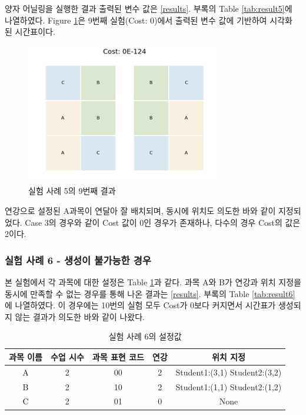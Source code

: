 \documentclass[12pt,a4paper]{article}
\begin{document}
    양자 어닐링을 실행한 결과 출력된 변수 값은 \ref{results}. 부록의 Table \ref{tab:result5}에 나열하였다. Figure \ref{fig:case5}은 9번째 실험(Cost: 0)에서 출력된 변수 값에 기반하여 시각화 된 시간표이다.

    \begin{figure}[htb!]
        \centering
        \includegraphics[width=\textwidth]{Case5.png}
        \caption{실험 사례 5의 9번째 결과}
        \label{fig:case5}
    \end{figure}

    연강으로 설정된 A과목이 연달아 잘 배치되며, 동시에 위치도 의도한 바와 같이 지정되었다. Case 3의 경우와 같이 Cost 값이 0인 경우가 존재하나, 다수의 경우 Cost의 값은 2이다. 

    \subsubsection{실험 사례 6 - 생성이 불가능한 경우}

    본 실험에서 각 과목에 대한 설정은 Table \ref{tab:testcase6}과 같다. 과목 A와 B가 연강과 위치 지정을 동시에 만족할 수 없는 경우를 통해 나온 결과는 \ref{results}. 부록의 Table \ref{tab:result6}에 나열하였다. 이 경우에는 10번의 실험 모두 Cost가 0보다 커지면서 시간표가 생성되지 않는 결과가 의도한 바와 같이 나왔다. 

    \begin{table}[htb!]
        \centering
        \begin{tabular}{c c c c c}
             \hline
             과목 이름 & 수업 시수 & 과목 표현 코드 & 연강 & 위치 지정\\
             \hline
             A & 2 & 00 & 2 & Student1:(3,1) Student2:(3,2)\\
             B & 2 & 10 & 2 & Student1:(1,1) Student2:(1,2)\\
             C & 2 & 01 & 0 & None\\
             \hline
        \end{tabular}
        \caption{실험 사례 6의 설정값}\label{tab:testcase6}
    \end{table}
\end{document}
